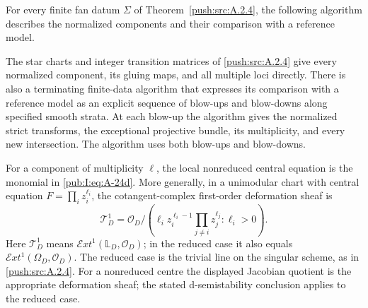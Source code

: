 \begin{proposition}\hypertarget{tag-02ZN}{}\label{push:src:A.2.5}\label{push:A25}

For every finite fan datum $\Sigma$ of Theorem~\ref{push:src:A.2.4}, the following algorithm describes the normalized components and their comparison with a reference model.

The star charts and integer transition matrices of \ref{push:src:A.2.4}
give every normalized component, its gluing maps, and
all multiple loci directly. There is also a terminating
finite-data algorithm that expresses its comparison
with a reference model as an explicit sequence of
blow-ups and blow-downs along specified smooth strata.
At each blow-up the algorithm gives the normalized
strict transforms, the exceptional projective bundle,
its multiplicity, and every new intersection.
The algorithm uses both blow-ups and blow-downs.

For a component of multiplicity $\ell$, the local
nonreduced central equation is the monomial in \eqref{pub:I:eq:A-24d}.
More generally, in a unimodular chart with central
equation $F=\prod_i z_i^{\ell_i}$, the cotangent-complex
first-order deformation sheaf is
\begin{equation}
 \mathcal T^1_D
  =\mathcal O_D\Big/
    \left(\ell_i z_i^{\ell_i-1}
          \prod_{j\ne i}z_j^{\ell_j}:\ell_i>0\right).
\label{pub:I:eq:A-25a}
\end{equation}
Here $\mathcal T^1_D$ means
$\mathcal Ext^1(\mathbb L_D,\mathcal O_D)$; in the
reduced case it also equals
$\mathcal Ext^1(\Omega_D,\mathcal O_D)$.
The reduced case is the trivial line on the singular
scheme, as in \ref{push:src:A.2.4}. For a nonreduced centre the displayed
Jacobian quotient is the appropriate deformation sheaf;
the stated d-semistability conclusion applies to the reduced case.
\end{proposition}


